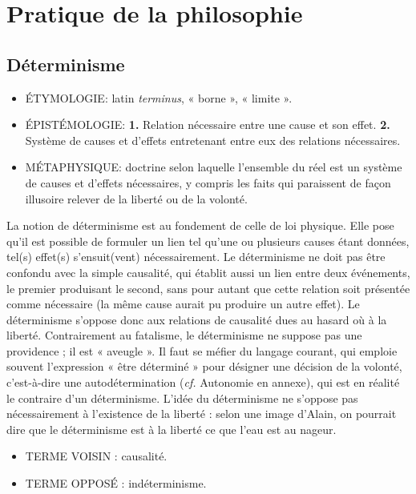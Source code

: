 
\section{Pratique de la philosophie}

\subsection{Déterminisme}

\begin{itemize}[leftmargin=1cm, label=, itemsep=1pt]
\item {\footnotesize ÉTYMOLOGIE}: latin {\it terminus}, « borne », « limite ».
\item {\footnotesize ÉPISTÉMOLOGIE}: {\bf 1.} Relation nécessaire entre une cause et son effet. {\bf 2.} Système de causes et d'effets entretenant entre eux des relations nécessaires.
\item {\footnotesize MÉTAPHYSIQUE}: doctrine selon laquelle l'ensemble du réel est un système de causes et d'effets nécessaires, y compris les faits qui paraissent de façon illusoire relever de la liberté ou de la volonté.
\end{itemize}


La notion de déterminisme est au fondement de celle de loi physique. Elle pose
qu'il est possible de formuler un lien tel
qu'une ou plusieurs causes étant données, tel(s) effet(s) s'ensuit(vent) nécessairement. Le déterminisme ne doit pas
être confondu avec la simple causalité,
qui établit aussi un lien entre deux événements, le premier produisant le
second, sans pour autant que cette relation soit présentée comme nécessaire (la
même cause aurait pu produire un autre
effet). Le déterminisme s'oppose donc
aux relations de causalité dues au hasard
où à la liberté. Contrairement au fatalisme, le déterminisme ne suppose pas
une providence ; il est « aveugle ». Il faut
se méfier du langage courant, qui
emploie souvent l'expression « être déterminé » pour désigner une décision de la
volonté, c'est-à-dire une autodétermination ({\it cf.} Autonomie en annexe), qui est en réalité le
contraire d’un déterminisme. L'idée du
déterminisme ne s'oppose pas nécessairement à l'existence de la liberté : selon
une image d’Alain, on pourrait dire que
le déterminisme est à la liberté ce que
l'eau est au nageur.

\begin{itemize}[leftmargin=1cm, label=, itemsep=1pt]
\item {\footnotesize TERME VOISIN} : causalité.
\item {\footnotesize TERME OPPOSÉ} : indéterminisme.
\end{itemize}

